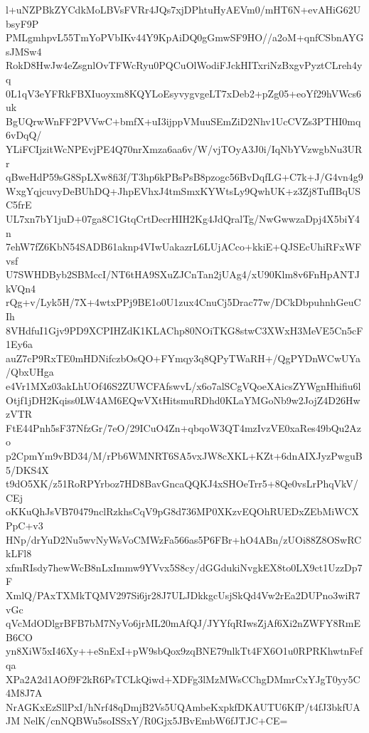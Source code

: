 l+uNZPBkZYCdkMoLBVsFVRr4JQs7xjDPhtuHyAEVm0/mHT6N+evAHiG62UbsyF9P
PMLgmhpvL55TmYoPVbIKv44Y9KpAiDQ0gGmwSF9HO//a2oM+qnfCSbnAYGsJMSw4
RokD8HwJw4eZsgnlOvTFWcRyu0PQCuOlWodiFJckHITxriNzBxgvPyztCLreh4yq
0L1qV3eYFRkFBXIuoyxm8KQYLoEsyvygvgeLT7xDeb2+pZg05+eoYf29hVWcs6uk
BgUQrwWnFF2PVVwC+bmfX+uI3ijppVMuuSEmZiD2Nhv1UcCVZs3PTHI0mq6vDqQ/
YLiFCIjzitWcNPEvjPE4Q70nrXmza6aa6v/W/vjTOyA3J0i/IqNbYVzwgbNu3URr
qBweHdP59sG8SpLXw8fi3f/T3hp6kPBsPsB8pzogc56BvDqfLG+C7k+J/G4vn4g9
WxgYqjcuvyDeBUhDQ+JhpEVhxJ4tmSmxKYWtsLy9QwhUK+z3Zj8TufIBqUSC5frE
UL7xn7bY1juD+07ga8C1GtqCrtDecrHIH2Kg4JdQralTg/NwGwwzaDpj4X5biY4n
7ehW7fZ6KbN54SADB61aknp4VIwUakazrL6LUjACco+kkiE+QJSEcUhiRFxWFvsf
U7SWHDByb2SBMccI/NT6tHA9SXuZJCnTan2jUAg4/xU90Klm8v6FnHpANTJkVQn4
rQg+v/Lyk5H/7X+4wtxPPj9BE1o0U1zux4CnuCj5Drac77w/DCkDbpuhnhGeuCIh
8VHdfuI1Gjv9PD9XCPIHZdK1KLAChp80NOiTKG8stwC3XWxH3MeVE5Cn5cF1Ey6a
auZ7cP9RxTE0mHDNifczbOsQO+FYmqy3q8QPyTWaRH+/QgPYDnWCwUYa/QbxUHga
e4Vr1MXz03akLhUOf46S2ZUWCFAfswvL/x6o7alSCgVQoeXAicsZYWgnHhifiu6l
Otjf1jDH2Kqiss0LW4AM6EQwVXtHitsmuRDhd0KLaYMGoNb9w2JojZ4D26HwzVTR
FtE44Pnh5sF37NfzGr/7eO/29ICuO4Zn+qbqoW3QT4mzIvzVE0xaRes49bQu2Azo
p2CpmYm9vBD34/M/rPb6WMNRT6SA5vxJW8cXKL+KZt+6dnAIXJyzPwguB5/DKS4X
t9dO5XK/z51RoRPYrboz7HD8BavGncaQQKJ4xSHOeTrr5+8Qe0vsLrPhqVkV/CEj
oKKuQhJsVB70479nclRzkhsCqV9pG8d736MP0XKzvEQOhRUEDxZEbMiWCXPpC+v3
HNp/drYuD2Nu5wvNyWsVoCMWzFa566as5P6FBr+hO4ABn/zUOi88Z8OSwRCkLFl8
xfmRIsdy7hewWcB8nLxImmw9YVvx5S8cy/dGGdukiNvgkEX8to0LX9ct1UzzDp7F
XmlQ/PAxTXMkTQMV297Si6jr28J7ULJDkkgcUsjSkQd4Vw2rEa2DUPno3wiR7vGc
qVcMdODlgrBFB7bM7NyVo6jrML20mAfQJ/JYYfqRIwsZjAf6Xi2nZWFY8RmEB6CO
yn8XiW5xI46Xy++eSnExI+pW9sbQox9zqBNE79nlkTt4FX6O1u0RPRKhwtnFefqa
XPa2A2d1AOf9F2kR6PsTCLkQiwd+XDFg3lMzMWsCChgDMmrCxYJgT0yy5C4M8J7A
NrAGKxEzSllPxI/hNrf48qDmjB2Vs5UQAmbeKxpkfDKAUTU6KfP/t4fJ3bkfUAJM
NelK/cnNQBWu5soISSxY/R0Gjx5JBvEmbW6fJTJC+CE=
